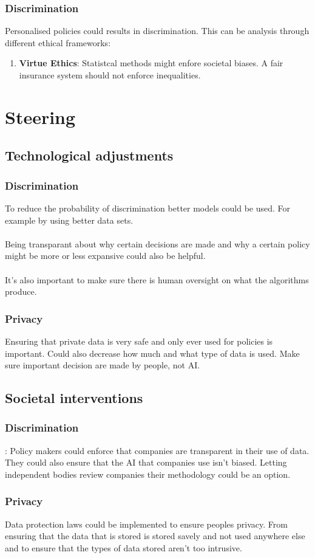 \documentclass[a4paper, 12pt, table]{article}
\numberwithin{equation}{section}
\begin{document}
\subsubsection{Discrimination}
Personalised policies could results in discrimination. This can be analysis through different ethical frameworks:
\begin{enumerate}
    \item \textbf{Virtue Ethics}: Statistcal methods might enfore societal biases. A fair insurance system should not enforce inequalities.
\end{enumerate}
\section{Steering}
\subsection{Technological adjustments}
\subsubsection{Discrimination}
To reduce the probability of discrimination better models could be used. For example by using better data sets.\\\\
Being transparant about why certain decisions are made and why a certain policy might be more or less expansive could also be helpful.\\\\
It's also important to make sure there is human oversight on what the algorithms produce. 
\subsubsection{Privacy}
Ensuring that private data is very safe and only ever used for policies is important. Could also decrease how much and what type of data is used. Make sure important decision are made by people, not AI. 
\subsection{Societal interventions}
\subsubsection{Discrimination}:
Policy makers could enforce that companies are transparent in their use of data. They could also ensure that the AI that companies use isn't biased. Letting independent bodies review companies their methodology could be an option. 
\subsubsection{Privacy}
Data protection laws could be implemented to ensure peoples privacy. From ensuring that the data that is stored is stored savely and not used anywhere else and to ensure that the types of data stored aren't too intrusive.
\end{document}
